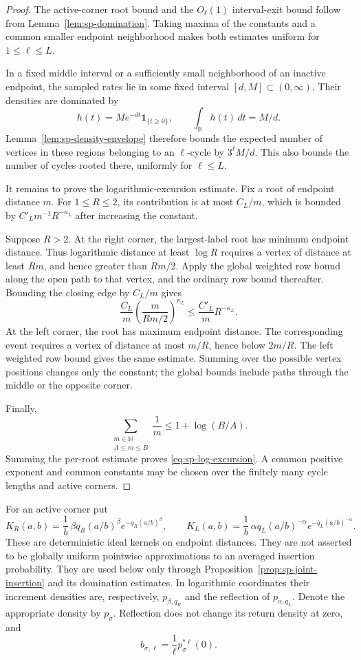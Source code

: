 \documentclass[11pt]{article}
\theoremstyle{remark}
\theoremstyle{plain}
\newcommand{\one}{\mathbf 1}
\begin{document}
\begin{proof}
The active-corner root bound and the $O_\ell(1)$ interval-exit bound follow
from Lemma~\ref{lem:sp-domination}.  Taking maxima of the constants and a
common smaller endpoint neighborhood makes both estimates uniform for
$1\le\ell\le L$.

In a fixed middle interval or a sufficiently small neighborhood of an
inactive endpoint, the sampled rates lie in some fixed interval
$[d,M]\subset(0,\infty)$.  Their densities are dominated by
\[
 h(t)=Me^{-dt}\one_{\{t\ge0\}},\qquad
 \int_{\mathbb R}h(t)\,dt=M/d.
\]
Lemma~\ref{lem:sp-density-envelope} therefore bounds the expected number
of vertices in these regions belonging to an $\ell$-cycle by
$3^\ell M/d$.  This also bounds the number of cycles rooted there,
uniformly for $\ell\le L$.

It remains to prove the logarithmic-excursion estimate.  Fix a root of
endpoint distance $m$.  For $1\le R\le2$, its contribution is at most
$C_L/m$, which is bounded by $C'_Lm^{-1}R^{-\kappa_L}$ after increasing
the constant.

Suppose $R>2$.  At the right corner, the largest-label root has minimum
endpoint distance.  Thus logarithmic distance at least $\log R$ requires
a vertex of distance at least $Rm$, and hence greater than $Rm/2$.
Apply the global weighted row bound along the open path to that vertex,
and the ordinary row bound thereafter.  Bounding the closing edge by
$C_L/m$ gives
\[
 \frac{C_L}{m}\left(\frac{m}{Rm/2}\right)^{\kappa_L}
 \le \frac{C'_L}{m}R^{-\kappa_L}.
\]
At the left corner, the root has maximum endpoint distance.  The
corresponding event requires a vertex of distance at most $m/R$, hence
below $2m/R$.  The left weighted row bound gives the same estimate.
Summing over the possible vertex positions changes only the constant;
the global bounds include paths through the middle or the opposite corner.

Finally,
\[
 \sum_{\substack{m\in\mathbb N\\A\le m\le B}}\frac1m
 \le1+\log(B/A).
\]
Summing the per-root estimate proves \eqref{eq:sp-log-excursion}.
A common positive exponent and common constants may be chosen over the
finitely many cycle lengths and active corners.
\end{proof}

For an active corner put
\[
 K_R(a,b)=\frac1b\,\beta q_R(a/b)^\beta
              e^{-q_R(a/b)^\beta},\qquad
 K_L(a,b)=\frac1b\,\alpha q_L(a/b)^{-\alpha}
              e^{-q_L(a/b)^{-\alpha}}.
\]
These are deterministic ideal kernels on endpoint distances.  They are
not asserted to be globally uniform pointwise approximations to an
averaged insertion probability.  They are used below only through
Proposition~\ref{prop:sp-joint-insertion} and its domination estimates.
In logarithmic coordinates their increment densities are, respectively,
$p_{\beta,q_R}$ and the reflection of $p_{\alpha,q_L}$.  Denote the
appropriate density by $p_\sigma$.  Reflection does not change its return
density at zero, and
\[
 b_{\sigma,\ell}=\frac1\ell p_\sigma^{*\ell}(0).
\]
\end{document}

